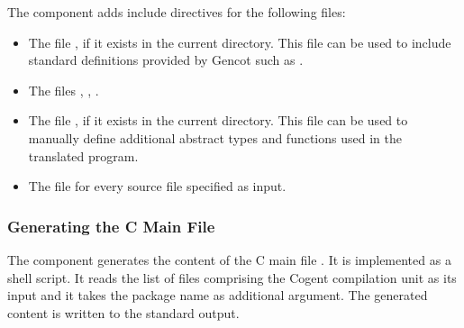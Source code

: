 The component adds include directives for the following files:
\begin{itemize}
\item The file , if it exists in the current directory. This file can be used to include standard 
definitions provided by Gencot such as .
\item The files , , .
\item The file , if it exists in the current directory. This file can be used to
manually define additional abstract types and functions used in the translated program.
\item The file  for every source file  specified as input.
\end{itemize}

\subsubsection{Generating the C Main File}

The component  generates the content of the C main file . 
It is implemented as a shell script. It reads the list of
 files comprising the Cogent compilation unit as its input and it takes the package name 
as additional argument. The generated content is written to the standard output. 

